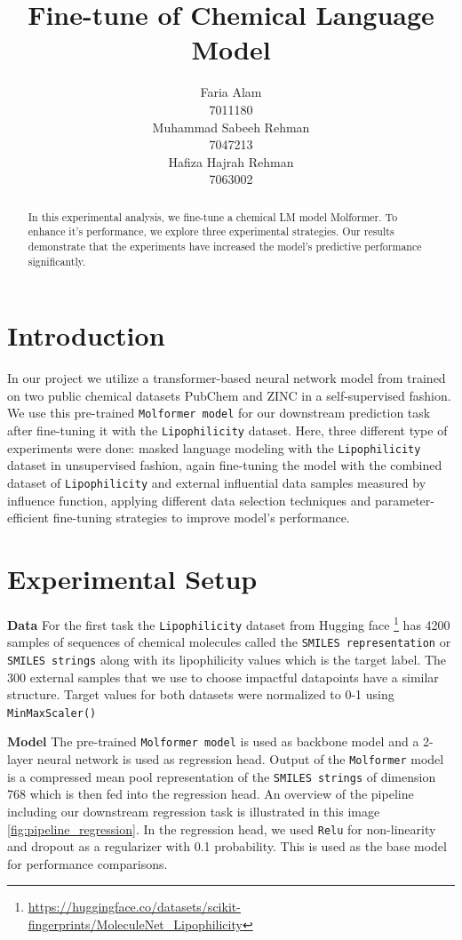 \documentclass[11pt]{article}
\title{Fine-tune of Chemical Language Model}
\author{Faria Alam \\
   7011180 \\\And
   Muhammad Sabeeh Rehman \\
   7047213 \\\And
   Hafiza Hajrah Rehman \\
   7063002 \\}
\begin{document}
\maketitle
\begin{abstract}
In this experimental analysis, we fine-tune a chemical LM model Molformer. To enhance it's performance, we explore three experimental strategies. Our results demonstrate that the experiments have increased the model's predictive performance significantly.  
\end{abstract}
\section*{Introduction}
In our project we utilize a transformer-based neural network model from \cite{ross2022largescalechemicallanguagerepresentations} trained on two public chemical datasets PubChem and ZINC in a self-supervised fashion. We use this pre-trained \verb|Molformer model| for our downstream prediction task after fine-tuning it with the \verb|Lipophilicity| dataset. Here, three different type of experiments were done: masked language modeling with the \verb|Lipophilicity| dataset in unsupervised fashion, again fine-tuning the model with the combined dataset of \verb|Lipophilicity| and external influential data samples measured by influence function, applying different data selection techniques and parameter-efficient fine-tuning strategies to improve model's performance.


\section*{Experimental Setup}

\textbf{Data} For the first task the \verb|Lipophilicity| dataset from Hugging face \footnote{\url{https://huggingface.co/datasets/scikit-fingerprints/MoleculeNet_Lipophilicity}} has 4200 samples of sequences of chemical molecules called the \verb|SMILES representation| or \verb|SMILES strings| along with its lipophilicity values which is the target label. The 300 external samples that we use to choose impactful datapoints have a similar structure. Target values for both datasets were normalized to 0-1 using \verb|MinMaxScaler()| 

\textbf{Model} The pre-trained \verb|Molformer model| is used as backbone model and a 2-layer neural network is used as regression head. Output of the \verb|Molformer| model is a compressed mean pool representation of the \verb|SMILES strings| of dimension 768 which is then fed into the regression head. An overview of the pipeline including our downstream regression task is illustrated in this image \ref{fig:pipeline_regression}. In the regression head, we used \verb|Relu| for non-linearity and dropout as a regularizer with 0.1 probability. This is used as the base model for performance comparisons.    
\end{document}
